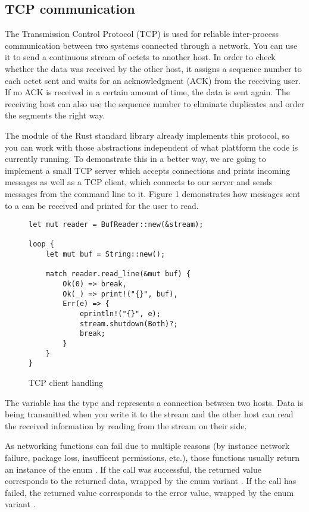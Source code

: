 \subsection{TCP communication}
The Transmission Control Protocol (TCP) is used for reliable inter-process communication between two systems connected
through a network. You can use it to send a continuous stream of octets to another host. In order to check whether the
data was received by the other host, it assigns a sequence number to each octet sent and waits for an acknowledgment
(ACK) from the receiving user. If no ACK is received in a certain amount of time, the data is sent again. The receiving
host can also use the sequence number to eliminate duplicates and order the segments the right way. \cite{RFC0793}

The module  of the Rust standard library already implements this protocol, so you can work with those
abstractions independent of what plattform the code is currently running. To demonstrate this in a better way, we are
going to implement a small TCP server which accepts connections and prints incoming messages as well as a TCP client,
which connects to our server and sends messages from the command line to it. Figure 1 demonstrates how messages sent to
a  can be received and printed for the user to read.

\begin{figure}[ht]
    \begin{verbatim}
let mut reader = BufReader::new(&stream);

loop {
    let mut buf = String::new();

    match reader.read_line(&mut buf) {
        Ok(0) => break,
        Ok(_) => print!("{}", buf),
        Err(e) => {
            eprintln!("{}", e);
            stream.shutdown(Both)?;
            break;
        }
    }
}
    \end{verbatim}
    \caption{TCP client handling}
\end{figure}

The variable  has the type  and represents a connection between two hosts. Data is being
transmitted when you write it to the stream and the other host can read the received information by reading from the
stream on their side.

As networking functions can fail due to multiple reasons (by instance network failure, package loss, insufficent
permissions, etc.), those functions usually return an instance of the enum . If the call was
successful, the returned value corresponds to the returned data, wrapped by the enum variant . If the call
has failed, the returned value corresponds to the error value, wrapped by the enum variant .

